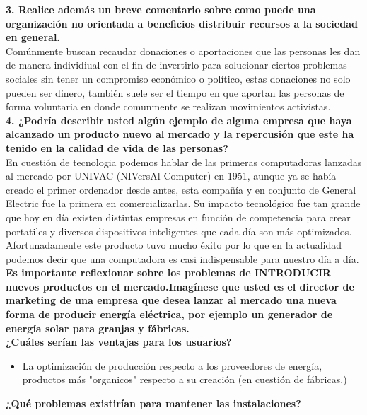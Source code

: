 \documentclass[letterpaper,12pt]{article}
\begin{document}
\begin{sloppypar}
\begin{itemize}
\end{itemize}
\textbf{3. Realice además un breve comentario sobre como puede una organización no orientada a beneficios distribuir recursos a la sociedad en general.} 
\vspace{0.3cm}\\
Comúnmente buscan recaudar donaciones o aportaciones que las personas les dan de manera individiual con el fin de invertirlo para solucionar ciertos problemas sociales sin tener un compromiso económico o político, estas donaciones no solo pueden ser dinero, también suele ser el tiempo en que aportan las personas de forma voluntaria en donde comunmente se realizan movimientos activistas. 
\vspace{0.3cm}\\
\textbf{4. ¿Podría describir usted algún ejemplo de alguna empresa que haya alcanzado un producto nuevo al mercado y la repercusión que este ha tenido en la calidad de vida de las personas?}
\vspace{0.3cm}\\
En cuestión de tecnologia podemos hablar de las primeras computadoras lanzadas al mercado por UNIVAC (NIVersAl Computer) en 1951, aunque ya se había creado el primer ordenador desde antes, esta compañía  y en conjunto de General Electric fue la primera en comercializarlas. Su impacto tecnológico fue tan grande que hoy en día existen distintas empresas en función de competencia para crear portatiles y diversos dispositivos inteligentes que cada día son más optimizados. Afortunadamente este producto tuvo mucho éxito por lo que en la actualidad podemos decir que una computadora es casi indispensable para nuestro día a día.
\newpage
\textbf{Es importante reflexionar sobre los problemas de INTRODUCIR nuevos productos en el mercado.Imagínese que usted es el director de marketing de una empresa que desea lanzar al mercado una nueva forma de producir energía eléctrica, por ejemplo un generador de energía solar para granjas y fábricas.}
\vspace{0.3cm}\\
\textbf{¿Cuáles serían las ventajas para los usuarios?}
\begin{itemize}
    \item La optimización de producción respecto a los proveedores de energía, productos más "organicos" respecto a su creación (en cuestión de fábricas.)
\end{itemize}
\textbf{¿Qué problemas existirían para mantener las instalaciones?}
\begin{itemize}

\end{itemize}
\end{sloppypar}
\end{document}
